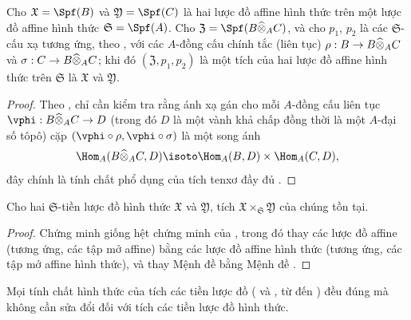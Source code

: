 \documentclass[oneside]{amsart}
\makeatletter
\newcommand{\ega@arrow}[2]{\mathchoice{#1}{#2}{#2}{#2}}
\renewcommand{\to}{\ega@arrow{\longrightarrow}{\rightarrow}}
\let\EGAOriginalLabel\label
\renewcommand{\label}[1]{\phantomsection\EGAOriginalLabel{#1}}
\makeatother
\begin{document}
\begin{proposition}[10.7.2]
\label{I.10.7.2}
Cho $\mathfrak{X}=\Spf(B)$ và $\mathfrak{Y}=\Spf(C)$ là hai lược đồ affine hình thức trên một lược đồ affine hình thức $\mathfrak{S}=\Spf(A)$.
Cho $\mathfrak{Z}=\Spf(B\widehat{\otimes}_A C)$, và cho $p_1$, $p_2$ là các $\mathfrak{S}$-cấu xạ tương ứng, theo , với các $A$-đồng cấu chính tắc (liên tục) $\rho:B\to B\widehat{\otimes}_A C$ và $\sigma:C\to B\widehat{\otimes}_A C$; khi đó $(\mathfrak{Z},p_1,p_2)$ là một tích của hai lược đồ affine hình thức trên $\mathfrak{S}$ là $\mathfrak{X}$ và $\mathfrak{Y}$.
\end{proposition}

\begin{proof}
Theo , chỉ cần kiểm tra rằng ánh xạ gán cho mỗi $A$-đồng cấu liên tục $\vphi:B\widehat{\otimes}_A C\to D$ (trong đó $D$ là một vành khả chấp đồng thời là một $A$-đại số tôpô) cặp $(\vphi\circ\rho,\vphi\circ\sigma)$ là một song ánh
\[
  \Hom_A(B\widehat{\otimes}_A C,D)\isoto\Hom_A(B,D)\times\Hom_A(C,D),
\]
đây chính là tính chất phổ dụng của tích tenxơ đầy đủ .
\end{proof}

\begin{proposition}[10.7.3]
\label{I.10.7.3}
Cho hai $\mathfrak{S}$-tiền lược đồ hình thức $\mathfrak{X}$ và $\mathfrak{Y}$, tích $\mathfrak{X}\times_\mathfrak{S}\mathfrak{Y}$ của chúng tồn tại.
\end{proposition}

\begin{proof}
Chứng minh giống hệt chứng minh của , trong đó thay các lược đồ affine (tương ứng, các tập mở affine) bằng các lược đồ affine hình thức (tương ứng, các tập mở affine hình thức), và thay Mệnh đề  bằng Mệnh đề .
\end{proof}

Mọi tính chất hình thức của tích các tiền lược đồ ( và , từ  đến ) đều đúng mà không cần sửa đổi đối với tích các tiền lược đồ hình thức.
\end{document}

